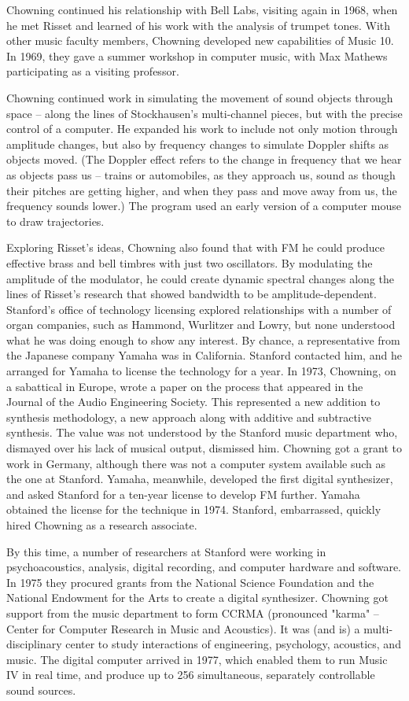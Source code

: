 Chowning continued his relationship with Bell Labs, visiting again in 1968, when he met Risset and learned of his work with the analysis of trumpet tones. With other music faculty members, Chowning developed new capabilities of Music 10. In 1969, they gave a summer workshop in computer music, with Max Mathews participating as a visiting professor.

Chowning continued work in simulating the movement of sound objects through space -- along the lines of Stockhausen's multi-channel pieces, but with the precise control of a computer. He expanded his work to include not only motion through amplitude changes, but also by frequency changes to simulate Doppler shifts as objects moved. (The Doppler effect refers to the change in frequency that we hear as objects pass us -- trains or automobiles, as they approach us, sound as though their pitches are getting higher, and when they pass and move away from us, the frequency sounds lower.) The program used an early version of a computer mouse to draw trajectories.

Exploring Risset's ideas, Chowning also found that with FM he could produce effective brass and bell timbres with just two oscillators. By modulating the amplitude of the modulator, he could create dynamic spectral changes along the lines of Risset's research that showed bandwidth to be amplitude-dependent. Stanford's office of technology licensing explored relationships with a number of organ companies, such as Hammond, Wurlitzer and Lowry, but none understood what he was doing enough to show any interest. By chance, a representative from the Japanese company Yamaha was in California. Stanford contacted him, and he arranged for Yamaha to license the technology for a year. In 1973, Chowning, on a sabattical in Europe, wrote a paper on the process that appeared in the Journal of the Audio Engineering Society. This represented a new addition to synthesis methodology, a new approach along with additive and subtractive synthesis. The value was not understood by the Stanford music department who, dismayed over his lack of musical output, dismissed him. Chowning got a grant to work in Germany, although there was not a computer system available such as the one at Stanford. Yamaha, meanwhile, developed the first digital synthesizer, and asked Stanford for a ten-year license to develop FM further. Yamaha obtained the license for the technique in 1974. Stanford, embarrassed, quickly hired Chowning as a research associate.

By this time, a number of researchers at Stanford were working in psychoacoustics, analysis, digital recording, and computer hardware and software. In 1975 they procured grants from the National Science Foundation and the National Endowment for the Arts to create a digital synthesizer. Chowning got support from the music department to form CCRMA (pronounced "karma" -- Center for Computer Research in Music and Acoustics). It was (and is) a multi-disciplinary center to study interactions of engineering, psychology, acoustics, and music. The digital computer arrived in 1977, which enabled them to run Music IV in real time, and produce up to 256 simultaneous, separately controllable sound sources.

